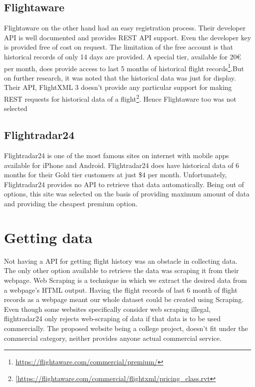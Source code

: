 \subsection{Flightaware}
Flightaware on the other hand had an easy registration process. Their developer API is well documented and provides REST API support. Even the developer key is provided free of cost on request. The limitation of the free account is that historical records of only 14 days are provided. A special tier, available for 20€ per month, does provide access to last 5 months of historical flight records\footnote{\url{https://flightaware.com/commercial/premium/}}.But on further research, it was noted that  the historical data was just for display. Their API, FlightXML 3 doesn't provide any particular support for making REST requests for historical data of a flight\footnote{\url{[https://flightaware.com/commercial/flightxml/pricing_class.rvt}}. Hence Flightaware too was not selected

\subsection{Flightradar24}
Flightradar24 is one of the most famous sites on internet with mobile apps available for iPhone and Android. Flightradar24 does have historical data of 6 months for their Gold tier customers at just \$4 per month. Unfortunately, Flightradar24 provides no API to retrieve that data automatically. Being out of options, this site was selected on the basis of providing maximum amount of data and providing the cheapest premium option.

\section{Getting data}
Not having a API for getting flight history was an obstacle in collecting data. The only other option available to retrieve the data was scraping it from their webpage. Web Scraping is a technique in which we extract the desired data from a webpage's HTML output. Having the flight records of last 6 month of flight records as a webpage meant our whole dataset could be created using Scraping.
\\Even though some websites specifically consider web scraping illegal, flightradar24 only rejects web-scraping of data if that data is to be used commercially\cite{Hirschey2014SymbioticScraping}. The proposed website being a college project, doesn't fit under the commercial category, neither provides anyone actual commercial service. 

